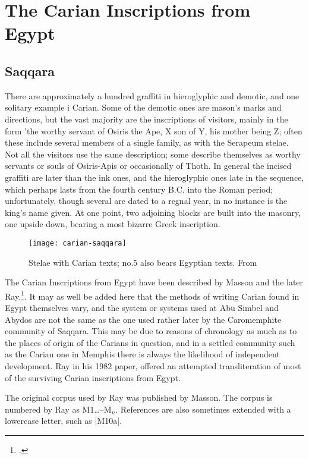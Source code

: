 \section{The Carian Inscriptions from Egypt}

\subsection{Saqqara}
There are approximately a hundred graffiti in hieroglyphic and demotic, and one solitary example
i Carian. Some of the demotic ones are mason's marks and directions, but the vast majority are
the inscriptions of visitors, mainly in the form 'the worthy servant of Osiris the Ape, X son of Y,
his mother being Z; often these include several members of a single family, as with the Serapeum
stelae. Not all the visitors use the same description; some describe themselves as worthy servants
or souls of Osiris-Apis or occasionally of Thoth. In general the incised graffiti are later than the
ink ones, and the hieroglyphic ones late in the sequence, which perhaps lasts from the fourth
century B.C. into the Roman period; unfortunately, though several are dated to a regnal year, in
no instance is the king's name given. At one point, two adjoining blocks are built into the masonry,
one upside down, bearing a most bizarre Greek inscription.\cite{emery1970}

\begin{figure}[htbp]
\texttt{[image: carian-saqqara]}
\caption{Stelae with Carian texts; no.5 also bears Egyptian texts. From \protect\cite{emery1970}}
\end{figure}

The Carian Inscriptions from Egypt have been described by Masson and the later Ray.\footcite{ray1982}.
It may as
well be added here that the methods of writing Carian found in Egypt themselves vary,
and the system or systems used at Abu Simbel and Abydos are not the same as the one
used rather later by the Caromemphite community of Saqqara. This may be due to
reasons of chronology as much as to the places of origin of the Carians in question,
and in a settled community such as the Carian one in Memphis there is always the
likelihood of independent development. Ray in his 1982 paper, offered an attempted transliteration of most of the surviving Carian inscriptions from Egypt. 

The original corpus used by Ray was published by Masson. The corpus is numbered by Ray as 
M1\ldots--M$_n$. References are also sometimes extended with a lowercase letter, such as |M10a|. 

